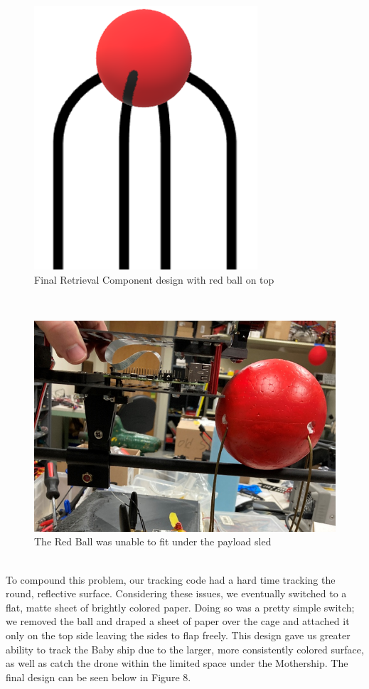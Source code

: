 \documentclass[11pt]{article}
\begin{document}
\begin{figure}[htp]
    \centering
    \includegraphics[scale=0.3]{Ball.png}
    \caption{Final Retrieval Component design with red ball on top}
\end{figure}\\
\begin{figure}[htp]
    \centering
    \includegraphics[scale=0.3]{Ball_Constructed.png}
    \caption{The Red Ball was unable to fit under the payload sled}
\end{figure}\\
To compound this problem, our tracking code had a hard time tracking the round, reflective surface. Considering these issues, we eventually switched to a flat, matte sheet of brightly colored paper. Doing so was a pretty simple switch; we removed the ball and draped a sheet of paper over the cage and attached it only on the top side leaving the sides to flap freely. This design gave us greater ability to track the Baby ship due to the larger, more consistently colored surface, as well as catch the drone within the limited space under the Mothership. The final design can be seen below in Figure 8. 
\end{document}
